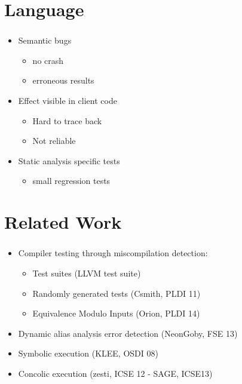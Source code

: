 \documentclass[mathserif,10pt]{beamer}
\begin{document}
\section{Language}
\frame
{
  \frametitle{\secname}
  \begin{itemize} [<+->]
    \item Semantic bugs
    \begin{itemize}
      \item no crash
      \item erroneous results
    \end{itemize} 
    \vspace{1cm}
    \item Effect visible in client code
    \begin{itemize}
      \item Hard to trace back
      \item Not reliable
    \end{itemize} 
    \vspace{1cm}
    \item Static analysis specific tests
    \begin{itemize}
      \item small regression tests
    \end{itemize} 
  \end{itemize} 
}

\section{Related Work}
\frame
{
  \frametitle{\secname}
  \begin{itemize} [<+->]
    \item Compiler testing through miscompilation detection:
    \begin{itemize}
      \item Test suites (LLVM test suite)
      \item Randomly generated tests (Csmith, PLDI 11)
      \item Equivalence Modulo Inputs (Orion, PLDI 14)
    \end{itemize} 
    \vspace{1cm}
    \item Dynamic alias analysis error detection (NeonGoby, FSE 13)

    \vspace{1cm}
    \item Symbolic execution (KLEE, OSDI 08) 
    \item Concolic execution (zesti, ICSE 12 - SAGE, ICSE13)
  \end{itemize} 
}
\end{document}
